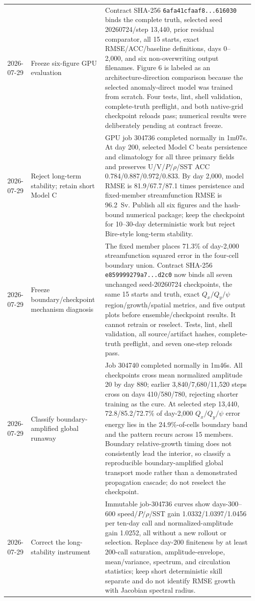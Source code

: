 \documentclass[11pt]{article}
\begin{document}
\begin{longtable}{@{}p{}p{}p{}@{}}
2026-07-29 & Freeze six-figure GPU evaluation & Contract SHA-256 \texttt{6afa41cfaaf8...616030} binds the complete truth, selected seed 20260724/step 13,440, prior residual comparator, all 15 starts, exact RMSE/ACC/baseline definitions, days 0--2,000, and six non-overwriting output filenames.  Figure 6 is labeled as an architecture-direction comparison because the selected anomaly-direct model was trained from scratch.  Four tests, lint, shell validation, complete-truth preflight, and both native-grid checkpoint reloads pass; numerical results were deliberately pending at contract freeze. \\
2026-07-29 & Reject long-term stability; retain short Model C & GPU job 304736 completed normally in 1m07s.  At day 200, selected Model C beats persistence and climatology for all three primary fields and preserves U/V/\(P/\rho\)/SST ACC 0.784/0.887/0.972/0.833.  By day 2,000, model RMSE is 81.9/67.7/87.1 times persistence and fixed-member streamfunction RMSE is 96.2~Sv.  Publish all six figures and the hash-bound numerical package; keep the checkpoint for 10--30-day deterministic work but reject Bire-style long-term stability. \\
2026-07-29 & Freeze boundary/checkpoint mechanism diagnosis & The fixed member places 71.3\% of day-2,000 streamfunction squared error in the four-cell boundary union.  Contract SHA-256 \texttt{e859999279a7...d2c0} now binds all seven unchanged seed-20260724 checkpoints, the same 15 starts and truth, exact \(Q_x/Q_y/\psi\) region/growth/spatial metrics, and five output plots before ensemble/checkpoint results.  It cannot retrain or reselect.  Tests, lint, shell validation, all source/artifact hashes, complete-truth preflight, and seven one-step reloads pass. \\
2026-07-29 & Classify boundary-amplified global runaway & Job 304740 completed normally in 1m46s.  All checkpoints cross mean normalized amplitude 20 by day 880; earlier 3,840/7,680/11,520 steps cross on days 410/580/780, rejecting shorter training as the cure.  At selected step 13,440, 72.8/85.2/72.7\% of day-2,000 \(Q_x/Q_y/\psi\) error energy lies in the 24.9\%-of-cells boundary band and the pattern recurs across 15 members.  Boundary relative-growth timing does not consistently lead the interior, so classify a reproducible boundary-amplified global transport mode rather than a demonstrated propagation cascade; do not reselect the checkpoint. \\
2026-07-29 & Correct the long-stability instrument & Immutable job-304736 curves show days-300--600 speed/\(P/\rho\)/SST gain 1.0332/1.0397/1.0456 per ten-day call and normalized-amplitude gain 1.0252, all without a new rollout or selection.  Replace day-200 finiteness by at least 200-call saturation, amplitude-envelope, mean/variance, spectrum, and circulation statistics; keep short deterministic skill separate and do not identify RMSE growth with Jacobian spectral radius. \\

\end{longtable}
\end{document}
